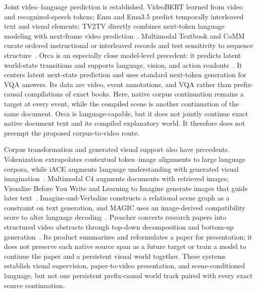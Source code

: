 \documentclass[11pt]{article}
\begin{document}
Joint video--language prediction is established. VideoBERT learned from video and recognized-speech tokens; Emu and Emu3.5 predict temporally interleaved text and visual elements; TV2TV directly combines next-token language modeling with next-frame video prediction~\cite{videobert,emu,emu35,tv2tv}. Multimodal Textbook and CoMM curate ordered instructional or interleaved records and test sensitivity to sequence structure~\cite{multimodaltextbook,comm}. Orca is an especially close model-level precedent: it predicts latent world-state transitions and supports language, vision, and action readouts~\cite{orca2026}. It centers latent next-state prediction and uses standard next-token generation for VQA answers. Its data are video, event annotations, and VQA rather than prefix-causal compilations of exact books. Here, native corpus continuation remains a target at every event, while the compiled scene is another continuation of the same document. Orca is language-capable, but it does not jointly continue exact native document text and its compiled explanatory world. It therefore does not preempt the proposed corpus-to-video route.

Corpus transformation and generated visual support also have precedents. Vokenization extrapolates contextual token--image alignments to large language corpora, while iACE augments language understanding with generated visual imagination~\cite{tan2020vokenization,lu2022imagination}. Multimodal C4 augments documents with retrieved images; Visualize Before You Write and Learning to Imagine generate images that guide later text~\cite{zhu2023mmc4,zhu2023visualize,tang2023learning}. Imagine-and-Verbalize constructs a relational scene graph as a constraint on text generation, and MAGIC uses an image-derived compatibility score to alter language decoding~\cite{wang2022scene,su2022magic}. Preacher converts research papers into structured video abstracts through top-down decomposition and bottom-up generation~\cite{preacher}. Its product summarizes and reformulates a paper for presentation; it does not preserve each native source span as a future target or train a model to continue the paper and a persistent visual world together. These systems establish visual supervision, paper-to-video presentation, and scene-conditioned language, but not one persistent prefix-causal world track paired with every exact source continuation.
\end{document}
